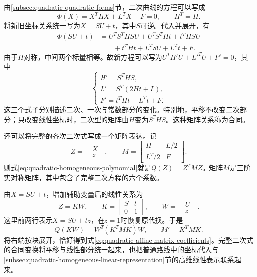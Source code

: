 由\ref{subsec:quadratic-quadratic-forms}节，二次曲线的方程可以写成
\begin{equation*}
    \Phi(X)=X^THX+L^TX+F=0 , \qquad H^T=H .
\end{equation*}
将新旧坐标关系统一写为\(X=SU+t\)，其中\(S\)可逆。代入并展开，有
\begin{align*}
    \Phi(SU+t)
    &=U^TS^THSU+U^TS^THt+t^THSU\\
    &\qquad+t^THt+L^TSU+L^Tt+F .
\end{align*}
由于\(H\)对称，中间两个标量相等。故新方程可以写为\(U^TH'U+L'^TU+F'=0\)，其中
\begin{equation}\label{eq:quadratic-affine-matrix-coefficients}
    \begin{cases}
        H'=S^THS ,\\
        L'=S^T(2Ht+L) ,\\
        F'=t^THt+L^Tt+F .
    \end{cases}
\end{equation}
这三个式子分别描述二次、一次与常数部分的变化。特别地，平移不改变二次部分；只改变线性坐标时，二次型的矩阵由\(H\)变为\(S^THS\)。这种矩阵关系称为{\heiti{}合同}。

还可以将完整的齐次二次式写成一个矩阵表达。记
\begin{equation}\label{eq:quadratic-full-symmetric-matrix}
    Z=\left[\begin{matrix}X\\z\end{matrix}\right] , \qquad
    M=\left[\begin{matrix}H&L/2\\L^T/2&F\end{matrix}\right] .
\end{equation}
则式\eqref{eq:quadratic-homogeneous-polynomial}就是\(Q(Z)=Z^TMZ\)。矩阵\(M\)是三阶实对称矩阵，其中包含了完整二次方程的六个系数。

由\(X=SU+t\)，增加辅助变量后的线性关系为
\begin{equation*}
    Z=KW , \qquad
    K=\left[\begin{matrix}S&t\\0&1\end{matrix}\right] , \qquad
    W=\left[\begin{matrix}U\\z\end{matrix}\right] .
\end{equation*}
这里前两行表示\(X=SU+tz\)，在\(z=1\)时恢复原代换。于是
\begin{equation}\label{eq:quadratic-full-matrix-congruence}
    Q(KW)=W^T(K^TMK)W , \qquad M'=K^TMK .
\end{equation}
将右端按块展开，恰好得到式\eqref{eq:quadratic-affine-matrix-coefficients}。完整二次式的合同变换将平移与线性部分统一起来，也把普通路线中的坐标代入与\ref{subsec:quadratic-homogeneous-linear-representation}节的高维线性表示联系起来。

